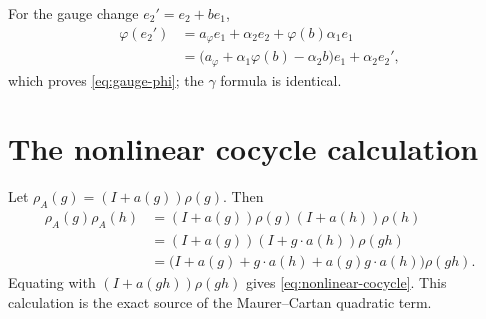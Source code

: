 \documentclass[11pt]{article}
\theoremstyle{definition}
\begin{document}
For the gauge change $e_2'=e_2+be_1$,
\begin{align*}
\varphi(e_2')
&=a_\varphi e_1+\alpha_2e_2+\varphi(b)\alpha_1e_1\\
&=\bigl(a_\varphi+\alpha_1\varphi(b)-\alpha_2b\bigr)e_1+\alpha_2e_2',
\end{align*}
which proves \eqref{eq:gauge-phi}; the $\gamma$ formula is identical.

\section{The nonlinear cocycle calculation}

Let $\rho_A(g)=(I+a(g))\rho(g)$.  Then
\begin{align*}
\rho_A(g)\rho_A(h)
&=(I+a(g))\rho(g)(I+a(h))\rho(h)\\
&=(I+a(g))(I+g\cdot a(h))\rho(gh)\\
&=\bigl(I+a(g)+g\cdot a(h)+a(g)g\cdot a(h)\bigr)\rho(gh).
\end{align*}
Equating with $(I+a(gh))\rho(gh)$ gives \eqref{eq:nonlinear-cocycle}.  This calculation is the exact source of the Maurer--Cartan quadratic term.
\end{document}
